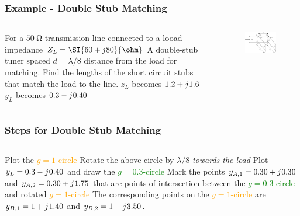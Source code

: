 \documentclass[10pt, compress]{beamer}
\renewcommand{\j}{{j}\mkern1mu} %
\begin{document}
\begin{frame}
    \frametitle{Example - Double Stub Matching}
    \begin{columns}[]
        \begin{column}[]{.5\textwidth}
            \begin{outline}
                \1 For a $\SI{50}{\ohm}$ transmission line connected to a looad impedance $Z_L = \SI{60 + j 80}{\ohm}$
                \1 A double-stub tuner spaced $d = \lambda/8$ distance from the load for matching.
                \1 Find the lengths of the short circuit stubs that match the load to the line.
                \1 $z_L$ becomes $1.2 + \j 1.6$
                \1 $y_L$ becomes $0.3 - \j 0.40$
            \end{outline}  
        \end{column}
        \begin{column}[]{.5\textwidth}
            \begin{figure}[]
                \centering
                \includegraphics[width=.9\textwidth]{tline_double_stub.pdf}
            \end{figure}
        \end{column}
    \end{columns}
\end{frame}

\begin{frame}
    \frametitle{Steps for Double Stub Matching}
    \begin{columns}[]
        \begin{column}[]{1\textwidth}
            \begin{outline}[enumerate]
                \1 Plot the \textcolor{orange}{$g =1 $-circle} 
                \1 Rotate the above circle by $\lambda/8$ \textit{towards the load}
                \1 Plot $y_L = 0.3 - \j 0.40$ and draw the \textcolor{green}{$g=0.3$-circle}
                \1 Mark the points $y_{A,1} = 0.30 + \j 0.30$ and $y_{A,2} = 0.30 + \j 1.75$ that are points of intersection between the \textcolor{green}{$g=0.3$-circle} and rotated \textcolor{orange}{$g=1$-circle}
                \1 The corresponding points on the \textcolor{orange}{$g=1$-circle} are $y_{B,1} = 1 + \j 1.40$ and $y_{B,2} = 1 - \j 3.50$.
            \end{outline}  
        \end{column}
    \end{columns}
\end{frame}
\end{document}
